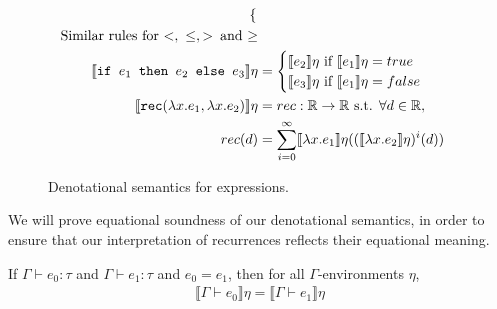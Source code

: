 \begin{figure}
\begin{align*}
\begin{cases}
   \end{cases}
 \\
\text{Similar rules for $<, \ \leq , >$\, and $\geq$} \\
  \llbracket \texttt{if } e_1 \texttt{ then } e_2 \texttt{ else } e_3 \rrbracket \eta &= 
 \begin{cases} 
      \llbracket e_2 \rrbracket\eta \text{ if } \llbracket e_1 \rrbracket\eta = true \\
      \llbracket e_3 \rrbracket\eta \text{ if } \llbracket e_1 \rrbracket\eta = false \\
   \end{cases}
  \\
   \llbracket  \texttt{rec} (\lambda x.e_1, \lambda x.e_2) \rrbracket\eta &= rec : \mathbb{R} \rightarrow \mathbb{R} \text{ s.t. } \forall d \in \mathbb{R}, \\
   rec(d) &= \sum_{i=0}^{\infty}\llbracket \lambda x.e_1 \rrbracket\eta ((\llbracket \lambda x.e_2 \rrbracket\eta)^i(d))
 \end{align*}
 \caption{Denotational semantics for expressions.}
 \label{fig:densemexps}
 \end{figure}
 
  We will prove equational soundness of our denotational semantics, in order to ensure that
 our interpretation of recurrences reflects their equational meaning.
 \begin{thm}
  If $\Gamma \vdash e_0 : \tau$ and $\Gamma \vdash e_1 : \tau$ and $e_0 = e_1$, then for all $\Gamma$-environments
  $\eta$,   
 \begin{align*}
 \llbracket \Gamma \vdash e_0 \rrbracket \eta 
 = \llbracket \Gamma \vdash e_1 \rrbracket \eta 
 \end{align*} 
 \end{thm}
 
